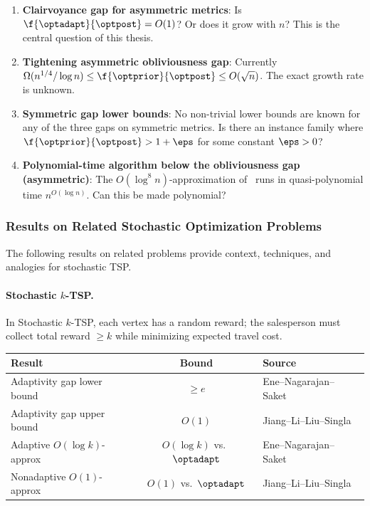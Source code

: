 \begin{enumerate}
    \item \textbf{Clairvoyance gap for asymmetric metrics}: Is $\f{\optadapt}{\optpost} = O(1)$? Or does it grow with $n$? This is the central question of this thesis.

    \item \textbf{Tightening asymmetric obliviousness gap}: Currently $\Omega(n^{1/4}/\log n) \le \f{\optprior}{\optpost} \le O(\sqrt{n})$. The exact growth rate is unknown.

    \item \textbf{Symmetric gap lower bounds}: No non-trivial lower bounds are known for any of the three gaps on symmetric metrics. Is there an instance family where $\f{\optprior}{\optpost} > 1 + \eps$ for some constant $\eps > 0$?

    \item \textbf{Polynomial-time algorithm below the obliviousness gap (asymmetric)}: The $O(\log^8 n)$-approximation of~\cite{Christalla2025} runs in quasi-polynomial time $n^{O(\log n)}$. Can this be made polynomial?
\end{enumerate}

\subsubsection{Results on Related Stochastic Optimization Problems}

The following results on related problems provide context, techniques, and analogies for stochastic TSP.

\paragraph{Stochastic $k$-TSP.}

In Stochastic $k$-TSP, each vertex has a random reward; the salesperson must collect total reward $\ge k$ while minimizing expected travel cost.

\begin{center}
\renewcommand{\arraystretch}{1.4}
\begin{tabular}{l c l}
    \hline
    \textbf{Result} & \textbf{Bound} & \textbf{Source} \\
    \hline
    Adaptivity gap lower bound & $\ge e$ & Ene--Nagarajan--Saket~\cite{EneNagarajanSaket2017} \\
    Adaptivity gap upper bound & $O(1)$ & Jiang--Li--Liu--Singla~\cite{JiangLiLiuSingla2020} \\
    Adaptive $O(\log k)$-approx & $O(\log k)$ vs.\ $\optadapt$ & Ene--Nagarajan--Saket~\cite{EneNagarajanSaket2017} \\
    Nonadaptive $O(1)$-approx & $O(1)$ vs.\ $\optadapt$ & Jiang--Li--Liu--Singla~\cite{JiangLiLiuSingla2020} \\
    \hline
\end{tabular}
\end{center}

